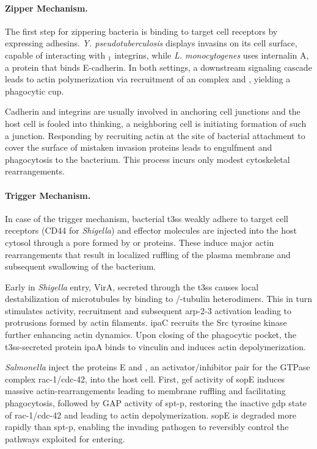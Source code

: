 \label{zipper-mechanism}

\paragraph{Zipper Mechanism.}
The first step for zippering bacteria is binding to target cell receptors by expressing adhesins. \textit{Y. pseudotuberculosis} displays invasins on its cell surface, capable of interacting with \textbeta$_1$ integrins, while \textit{L. monocytogenes} uses internalin A, a protein that binds E-cadherin. In both settings, a downstream signaling cascade leads to actin polymerization via recruitment of an  complex and , yielding a phagocytic cup.

Cadherin and integrins are usually involved in anchoring cell junctions and the host cell is fooled into thinking, a neighboring cell is initiating formation of such a junction. Responding by recruiting actin at the site of bacterial attachment to cover the surface of mistaken invasion proteins leads to engulfment and phagocytosis to the bacterium. This process incurs only modest cytoskeletal rearrangements. 

\label{trigger-mechanism}

\paragraph{Trigger Mechanism.}
In case of the trigger mechanism, bacterial \gls{t3ss} weakly adhere to target cell receptors (CD44 for \textit{Shigella}) and effector molecules are injected into the host cytosol through a pore formed by  or  proteins. These induce major actin rearrangements that result in localized ruffling of the plasma membrane and subsequent swallowing of the bacterium.

Early in \textit{Shigella} entry, VirA, secreted through the \gls{t3ss} causes local destabilization of microtubules by binding to \textalpha/\textbeta-tubulin heterodimers. This in turn stimulates  activity,  recruitment and subsequent \gls{arp-2-3} activation leading to protrusions formed by actin filaments. \Gls{ipa}C recruits the Src tyrosine kinase further enhancing actin dynamics. Upon closing of the phagocytic pocket, the \gls{t3ss}-secreted protein \gls{ipa}A binds to vinculin and induces actin depolymerization.

\textit{Salmonella} inject the proteins E and , an activator/inhibitor pair for the GTPase complex \gls{rac-1}/\gls{cdc-42}, into the host cell. First, \gls{gef} activity of \gls{sop}E induces massive actin-rearrangements leading to membrane ruffling and facilitating phagocytosis, followed by GAP activity of \gls{spt-p}, restoring the inactive \gls{gdp} state of \gls{rac-1}/\gls{cdc-42} and leading to actin depolymerization. \Gls{sop}E is degraded more rapidly than \gls{spt-p}, enabling the invading pathogen to reversibly control the pathways exploited for entering.

